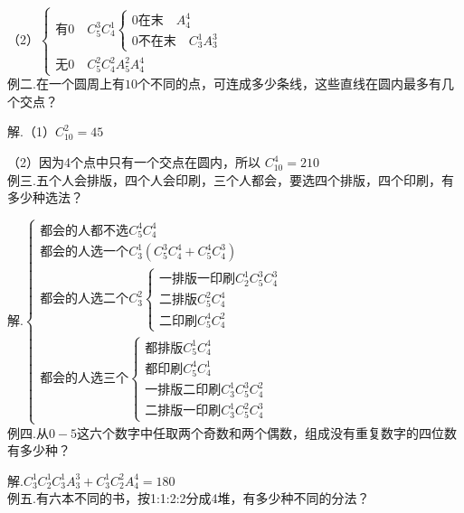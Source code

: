 \documentclass[UTF8]{ctexart}
\begin{document}
（2）$\left\{\begin{matrix} \text{有}0\quad C_{5}^{3} C_{4}^{1} \left\{\begin{matrix} 0\text{在末}\quad
A_{4}^{4}
 \\ 0\text{不在末}\quad C_{3}^{1} A_{3}^{3} 
\end{matrix}\right.
 \\
\text{无}0\quad C_{5}^{2} C_{4}^{2} A_{5}^{2} A_{4}^{4} 
\end{matrix}\right.$
\\

例二.在一个圆周上有$10$个不同的点，可连成多少条线，这些直线在圆内最多有几个交点？

解.（1）$C_{10}^{2} =45$

（2）因为4个点中只有一个交点在圆内，所以 $C_{10}^{4}=210 $
\\

例三.五个人会排版，四个人会印刷，三个人都会，要选四个排版，四个印刷，有多少种选法？

解.$\left\{\begin{matrix} \text{都会的人都不选}C_{5}^{4} C_{4}^{4} 
 \\\text{都会的人选一个}C_{3}^{1}(C_{5}^{3}C_{4}^{4}+C_{5}^{4}C_{4}^{3}    ) 
 \\\text{都会的人选二个}C_{3}^{2} \left\{\begin{matrix} \text{一排版一印刷} C_{2}^{1} C_{5}^{3}C_{4}^{3}
 \\\text{二排版}C_{5}^{2}C_{4}^{4}
 \\\text{二印刷}C_{5}^{4}C_{4}^{2}
\end{matrix}\right.
 \\\text{都会的人选三个}\left\{\begin{matrix} \text{都排版}C_{5}^{1}C_{4}^{4}
 \\\text{都印刷}C_{5}^{4}C_{4}^{1}
 \\\text{一排版二印刷}C_{3}^{1}C_{5}^{3}C_{4}^{2}
 \\\text{二排版一印刷}C_{3}^{1}C_{5}^{2}C_{4}^{3}
\end{matrix}\right.
\end{matrix}\right.$
\\

例四.从$0-5$这六个数字中任取两个奇数和两个偶数，组成没有重复数字的四位数有多少种？

解.$C_{3}^{1} C_{2}^{1} C_{3}^{1} A_{3}^{3} +C_{3}^{1} C_{2}^{2} A_{4}^{4}=180$
\\

例五.有六本不同的书，按1:1:2:2分成4堆，有多少种不同的分法？
\end{document}
